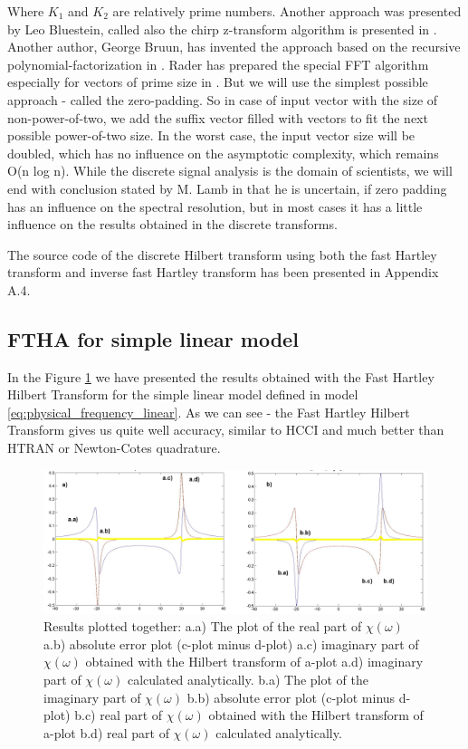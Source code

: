 \documentclass[12pt,twoside,a4paper]{article}
\numberwithin{equation}{subsection}
\numberwithin{figure}{subsection}
\begin{document}
Where ${K_{1}}$ and ${K_{2}}$ are relatively prime numbers. Another approach was presented by Leo Bluestein, called also the chirp
z-transform algorithm is presented in \cite{bluestein_linear}. Another author, George Bruun, has invented the approach based on
the recursive polynomial-factorization in \cite{bruun_ztransform}. Rader has prepared the special FFT algorithm especially for
vectors of prime size in \cite{rader_dicrete}. But we will use the simplest possible approach - called the zero-padding. So in case
of input vector with the size of non-power-of-two, we add the suffix vector filled with vectors to fit the next possible
power-of-two size. In the worst case, the input vector size will be doubled, which has no influence on the asymptotic complexity,
which remains O(n log n). While the discrete signal analysis is the domain of scientists, we will end with conclusion stated by M.
Lamb in \cite{lamb_issues} that he is uncertain, if zero padding has an influence on the spectral resolution, but in most cases it
has a little influence on the results obtained in the discrete transforms.

The source code of the discrete Hilbert transform using both the fast Hartley transform and inverse fast Hartley transform has been
presented in Appendix A.4.

\subsection{FTHA for simple linear model} \label{chap:hartley_lin}

In the Figure \ref{fig:fht_lin} we have presented the results obtained with the Fast Hartley Hilbert Transform for the simple
linear model defined in model \ref{eq:physical_frequency_linear}. As we can see - the Fast Hartley Hilbert Transform gives us quite well accuracy,
similar to HCCI and much better than HTRAN or Newton-Cotes quadrature. 

\begin{figure} 
  \includegraphics[width=150mm]{img/fht_lin.png}
  \caption{Results plotted together: 
   a.a) The plot of the real part of $\chi (\omega )$ 
   a.b) absolute error plot (c-plot minus d-plot) 
   a.c) imaginary part of $\chi (\omega )$ obtained with the Hilbert transform of a-plot 
   a.d) imaginary part of $\chi (\omega )$  calculated analytically. 
   b.a) The plot of the imaginary part of $\chi (\omega )$ 
   b.b) absolute error plot (c-plot minus d-plot) 
   b.c) real part of $\chi (\omega )$ obtained with the Hilbert transform of a-plot 
   b.d) real part of $\chi (\omega )$ calculated analytically. \label{fig:fht_lin}
  }
\end{figure}
\end{document}
